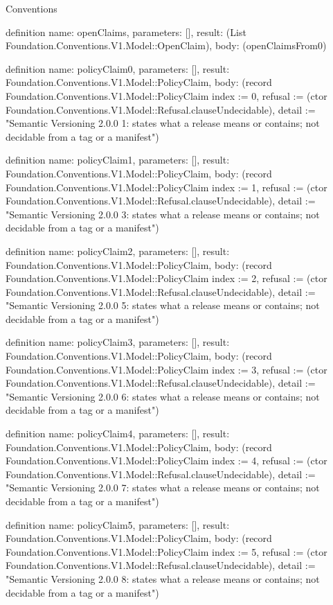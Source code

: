 \begin{lexlean}{Conventions}
\begin{semanticmodule}
definition{
  name: openClaims,
  parameters: [],
  result: (List Foundation.Conventions.V1.Model::OpenClaim),
  body: (openClaimsFrom0)
}

definition{
  name: policyClaim0,
  parameters: [],
  result: Foundation.Conventions.V1.Model::PolicyClaim,
  body: (record Foundation.Conventions.V1.Model::PolicyClaim {index := 0, refusal := (ctor Foundation.Conventions.V1.Model::Refusal.clauseUndecidable), detail := "Semantic Versioning 2.0.0 1: states what a release means or contains; not decidable from a tag or a manifest"})
}

definition{
  name: policyClaim1,
  parameters: [],
  result: Foundation.Conventions.V1.Model::PolicyClaim,
  body: (record Foundation.Conventions.V1.Model::PolicyClaim {index := 1, refusal := (ctor Foundation.Conventions.V1.Model::Refusal.clauseUndecidable), detail := "Semantic Versioning 2.0.0 3: states what a release means or contains; not decidable from a tag or a manifest"})
}

definition{
  name: policyClaim2,
  parameters: [],
  result: Foundation.Conventions.V1.Model::PolicyClaim,
  body: (record Foundation.Conventions.V1.Model::PolicyClaim {index := 2, refusal := (ctor Foundation.Conventions.V1.Model::Refusal.clauseUndecidable), detail := "Semantic Versioning 2.0.0 5: states what a release means or contains; not decidable from a tag or a manifest"})
}

definition{
  name: policyClaim3,
  parameters: [],
  result: Foundation.Conventions.V1.Model::PolicyClaim,
  body: (record Foundation.Conventions.V1.Model::PolicyClaim {index := 3, refusal := (ctor Foundation.Conventions.V1.Model::Refusal.clauseUndecidable), detail := "Semantic Versioning 2.0.0 6: states what a release means or contains; not decidable from a tag or a manifest"})
}

definition{
  name: policyClaim4,
  parameters: [],
  result: Foundation.Conventions.V1.Model::PolicyClaim,
  body: (record Foundation.Conventions.V1.Model::PolicyClaim {index := 4, refusal := (ctor Foundation.Conventions.V1.Model::Refusal.clauseUndecidable), detail := "Semantic Versioning 2.0.0 7: states what a release means or contains; not decidable from a tag or a manifest"})
}

definition{
  name: policyClaim5,
  parameters: [],
  result: Foundation.Conventions.V1.Model::PolicyClaim,
  body: (record Foundation.Conventions.V1.Model::PolicyClaim {index := 5, refusal := (ctor Foundation.Conventions.V1.Model::Refusal.clauseUndecidable), detail := "Semantic Versioning 2.0.0 8: states what a release means or contains; not decidable from a tag or a manifest"})
}


\end{semanticmodule}
\end{lexlean}
